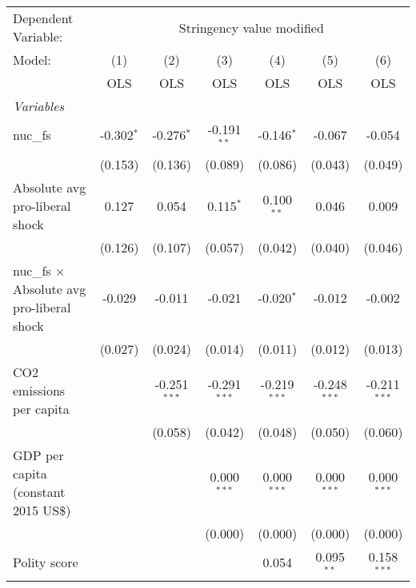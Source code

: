 
\begingroup
\centering
\begin{tabular}{lcccccc}
   \toprule
   Dependent Variable: & \multicolumn{6}{c}{Stringency value modified}\\
   Model:                                            & (1)          & (2)            & (3)            & (4)            & (5)            & (6)\\  
                                                     &  OLS         & OLS            & OLS            & OLS            & OLS            & OLS\\  
   \midrule
   \emph{Variables}\\
   nuc\_fs                                           & -0.302$^{*}$ & -0.276$^{*}$   & -0.191$^{**}$  & -0.146$^{*}$   & -0.067         & -0.054\\   
                                                     & (0.153)      & (0.136)        & (0.089)        & (0.086)        & (0.043)        & (0.049)\\   
   Absolute avg pro-liberal shock                    & 0.127        & 0.054          & 0.115$^{*}$    & 0.100$^{**}$   & 0.046          & 0.009\\   
                                                     & (0.126)      & (0.107)        & (0.057)        & (0.042)        & (0.040)        & (0.046)\\   
   nuc\_fs $\times$ Absolute avg pro-liberal shock   & -0.029       & -0.011         & -0.021         & -0.020$^{*}$   & -0.012         & -0.002\\   
                                                     & (0.027)      & (0.024)        & (0.014)        & (0.011)        & (0.012)        & (0.013)\\   
   CO2 emissions per capita                          &              & -0.251$^{***}$ & -0.291$^{***}$ & -0.219$^{***}$ & -0.248$^{***}$ & -0.211$^{***}$\\   
                                                     &              & (0.058)        & (0.042)        & (0.048)        & (0.050)        & (0.060)\\   
   GDP per capita (constant 2015 US\$)               &              &                & 0.000$^{***}$  & 0.000$^{***}$  & 0.000$^{***}$  & 0.000$^{***}$\\   
                                                     &              &                & (0.000)        & (0.000)        & (0.000)        & (0.000)\\   
   Polity score                                      &              &                &                & 0.054          & 0.095$^{**}$   & 0.158$^{***}$\\   

\end{tabular}
